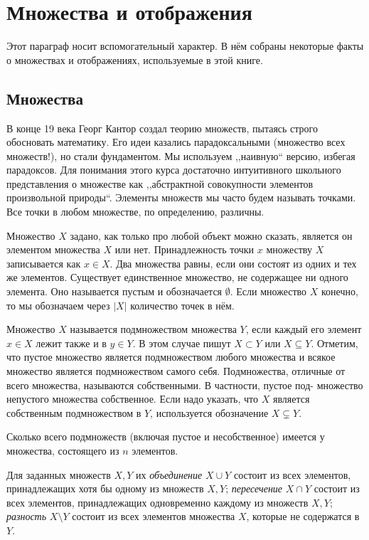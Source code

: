 \section{Множества и отображения}
Этот параграф носит вспомогательный характер. В нём собраны некоторые факты о множествах и отображениях, используемые в этой книге.
\subsection{Множества}
В конце 19 века Георг Кантор создал теорию множеств, пытаясь строго обосновать математику. Его идеи казались парадоксальными (множество всех множеств!), но стали фундаментом. Мы используем ,,наивную`` версию, избегая парадоксов. Для
понимания этого курса достаточно интуитивного школьного представления о множестве как ,,абстрактной совокупности элементов произвольной природы``. Элементы множеств мы часто будем называть точками. Все точки в любом множестве, по определению, различны.

Множество $X$ задано, как только про любой объект можно сказать, является он элементом множества $X$ или нет. Принадлежность точки $x$ множеству $X$ записывается как $x\in X$. Два множества равны, если они состоят из одних и тех же элементов. Существует единственное множество, не содержащее ни одного элемента. Оно называется пустым и обозначается $\emptyset$. Если множество $X$ конечно, то мы обозначаем через $|X|$ количество точек в нём. 

Множество $X$ называется подмножеством множества $Y$, если каждый его элемент $x\in X$ лежит также и в $y \in Y$. В этом случае пишут $X \subset Y$ или $X \subseteq Y$. Отметим, что пустое множество является подмножеством любого множества и всякое множество является подмножеством самого себя. Подмножества, отличные от всего множества, называются собственными. В частности, пустое под-
множество непустого множества собственное. Если надо указать, что $X$ является собственным подмножеством в $Y$, используется обозначение $X \subsetneq Y$.

\begin{practice}
    Сколько всего подмножеств (включая пустое и несобственное) имеется у множества, состоящего из $n$ элементов.
\end{practice}

Для заданных множеств $X, Y$ их \emph{объединение} $X \cup Y$ состоит из всех элементов, принадлежащих хотя бы одному из множеств $X, Y$; \emph{пересечение} $X \cap Y$ состоит из всех элементов, принадлежащих одновременно каждому из множеств $X, Y$; \emph{разность} $X \setminus Y$ состоит из всех элементов множества $X$, которые не содержатся в $Y$.

